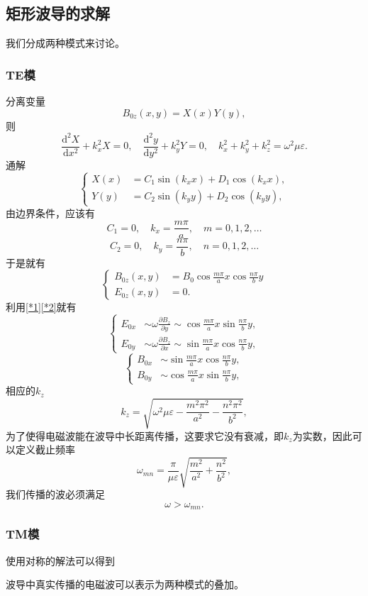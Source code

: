\documentclass[UTF8]{ctexbook}
\renewcommand{\d}{\mathrm{d}}
\numberwithin{equation}{chapter}
\begin{document}
	\subsection{矩形波导的求解}
	
	我们分成两种模式来讨论。
	\subsubsection{TE模}
	分离变量
	\[B_{0z}(x,y)=X(x)Y(y),\]
	则
	\[\frac{\d^2X}{\d x^2}+k_x^2X=0,\quad \frac{\d^2y}{\d y^2}+k_y^2Y=0,\quad k_x^2+k_y^2+k_z^2=\omega^2\mu\varepsilon.\]
	通解
	\[\left\{\begin{aligned}
		X(x)&=C_1\sin(k_x x)+D_1\cos(k_x x), \\
		Y(y)&=C_2\sin(k_y y)+D_2\cos(k_y y),		
	\end{aligned}\right.\]
	由边界条件，应该有
	\[C_1=0,\quad k_x=\frac{m\pi}{a},\quad m=0,1,2,\dots\]
	\[C_2=0,\quad k_y=\frac{n\pi}{b},\quad n=0,1,2,\dots\]
	于是就有
	\[\left\{\begin{aligned}
		B_{0z}(x,y)&=B_0\cos\frac{m\pi}{a}x\cos\frac{n\pi}{b}y \\
		E_{0z}(x,y)&=0.
	\end{aligned}
	\right.\]
	利用\ref{*1}\ref{*2}就有
	\[\left\{\begin{aligned}
	E_{0x}&\sim \omega\frac{\partial B_z}{\partial y}\sim\cos \frac{m\pi}{a}x\sin\frac{n\pi}{b}y, \\
	E_{0y}&\sim \omega\frac{\partial B_z}{\partial x}\sim\sin \frac{m\pi}{a}x\cos\frac{n\pi}{b}y,	
	\end{aligned}
	\right.\]
	\[\left\{\begin{aligned}
		B_{0x}&\sim\sin\frac{m\pi}{a} x\cos\frac{n\pi}{b}y,\\
		B_{0y}&\sim\cos\frac{m\pi}{a} x\sin\frac{n\pi}{b}y,
	\end{aligned}\right.\]
	相应的$k_z$
	\[k_z=\sqrt{\omega^2\mu\varepsilon-\frac{m^2\pi^2}{a^2}-\frac{n^2\pi^2}{b^2}},\]
	为了使得电磁波能在波导中长距离传播，这要求它没有衰减，即$k_z$为实数，因此可以定义截止频率
	\[\omega_{mn}=\frac{\pi}{\mu\varepsilon}\sqrt{\frac{m^2}{a^2}+\frac{n^2}{b^2}},\]
	我们传播的波必须满足
	\[\omega>\omega_{mn}.\]
	
	\subsubsection{TM模}
	使用对称的解法可以得到
	
	
	
	
	波导中真实传播的电磁波可以表示为两种模式的叠加。
	
\end{document}

